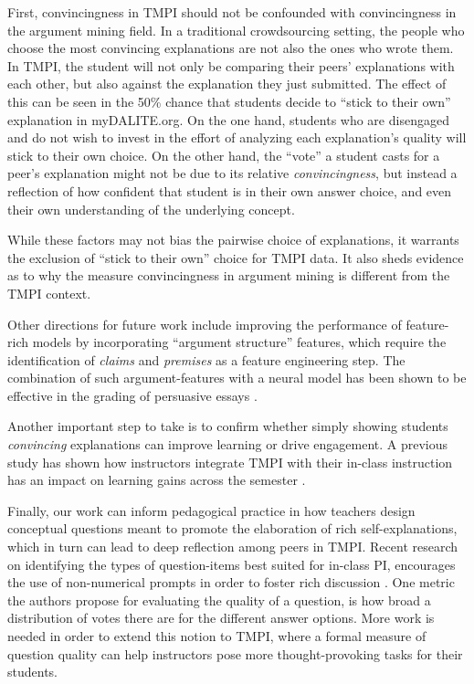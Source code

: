 \documentclass[notitlepage,12pt]{jedm}
\begin{document}
First, convincingness in TMPI should not be confounded with convincingness in the argument
mining field.  In a traditional crowdsourcing setting, the people who choose the most
convincing explanations are not also the ones who wrote them.  In TMPI, the student will not
only be comparing their peers' explanations with each other, but also against the explanation
they just submitted.  The effect of this can be seen in the 50\% chance that
students decide to ``stick to their own'' explanation in myDALITE.org.  On the one hand,
students who are disengaged and do not wish to invest in the effort of analyzing each explanation's
quality will stick to their own choice.  On the other hand, the ``vote'' a student casts for a
peer's explanation might not be due to its relative \textit{convincingness}, but instead a
reflection of how confident that student is in their own answer choice, and even their own
understanding of the underlying concept.

While these factors may not bias the pairwise choice of explanations, it warrants the
exclusion of ``stick to their own'' choice for TMPI data.  It also sheds evidence as to why
the measure convincingness in argument mining is different from the TMPI context.

Other directions for future work include improving the performance of 
feature-rich models by incorporating ``argument structure'' features, which 
require the identification of \textit{claims} and \textit{premises} as a 
feature engineering step.
The combination of such argument-features with a neural model has been shown to 
be effective in the grading of persuasive essays \cite{nguyen_argument_2018}.

Another important step to take is to confirm whether simply showing students 
\textit{convincing} explanations can improve learning or drive engagement. 
A previous study has shown how instructors integrate TMPI with their 
in-class instruction has an impact on learning gains across the semester 
\cite{bhatnagar_analysis_2015}. 

Finally, our work can inform pedagogical practice in how teachers design 
conceptual questions meant to promote the elaboration of rich 
self-explanations, which in turn can lead to deep reflection among peers in 
TMPI.
Recent research on identifying the types of question-items best suited for 
in-class PI, encourages the use of non-numerical prompts in order to foster 
rich discussion \cite{cline_identifying_2021}. 
One metric the authors propose for evaluating the quality of a question, is how 
broad a distribution of votes there are for the different answer options.
More work is needed in order to extend this notion to TMPI, where a formal 
measure of question quality can help instructors pose more thought-provoking 
tasks for their students.
 
\end{document}

